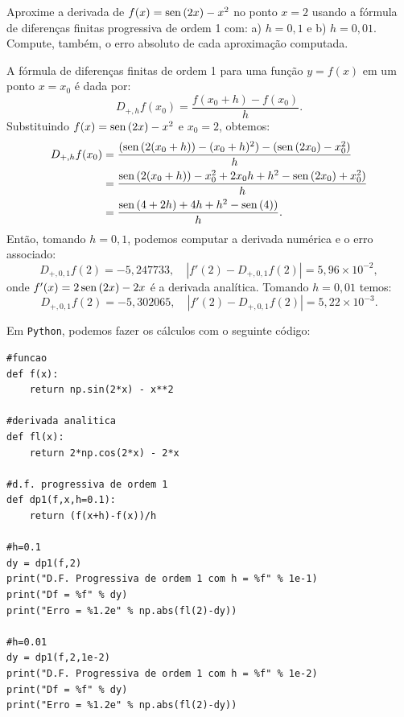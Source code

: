 \begin{exeresol}
Aproxime a derivada de $f(x)=\operatorname{sen}\,(2x) - x^2$ no ponto $x=2$ usando a fórmula de diferenças finitas progressiva de ordem 1 com: a) $h=0,1$ e b) $h=0,01$. Compute, também, o erro absoluto de cada aproximação computada.
\end{exeresol}
\begin{resol}
  A fórmula de diferenças finitas de ordem 1 para uma função $y = f(x)$ em um ponto $x = x_0$ é dada por:
  \begin{equation*}
    D_{+,h}f(x_0) = \frac{f(x_0+h) - f(x_0)}{h}.
  \end{equation*}
Substituindo $f(x) = \operatorname{sen}\,(2x) - x^2$ e $x_0 = 2$, obtemos:
  \begin{equation*}
    \begin{split}
      D_{+,h}f(x_0) &= \frac{(\operatorname{sen}\,(2(x_0+h)) - (x_0+h)^2) - (\operatorname{sen}\,(2x_0) - x_0^2)}{h}\\
      &= \frac{\operatorname{sen}\,(2(x_0+h)) - x_0^2 + 2x_0h + h^2 - \operatorname{sen}\,(2x_0) + x_0^2)}{h}\\
      &= \frac{\operatorname{sen}\,(4+2h) + 4h + h^2 - \operatorname{sen}\,(4))}{h}.
    \end{split}
  \end{equation*}
Então, tomando $h=0,1$, podemos computar a derivada numérica e o erro associado:
\begin{equation*}
  D_{+,0,1}f(2) = -5,247733,\quad |f'(2)-D_{+,0,1}f(2)| = 5,96\times 10^{-2},
\end{equation*}
onde $f'(x) = 2\operatorname{sen}\,(2x) - 2x$ é a derivada analítica. Tomando $h=0,01$ temos:
\begin{equation*}
  D_{+,0,1}f(2) = -5,302065,\quad |f'(2)-D_{+,0,1}f(2)| = 5,22\times 10^{-3}.
\end{equation*}

\ifispython
Em \verb+Python+, podemos fazer os cálculos com o seguinte código:
\begin{verbatim}
#funcao
def f(x):
    return np.sin(2*x) - x**2

#derivada analitica
def fl(x):
    return 2*np.cos(2*x) - 2*x

#d.f. progressiva de ordem 1
def dp1(f,x,h=0.1):
    return (f(x+h)-f(x))/h

#h=0.1
dy = dp1(f,2)
print("D.F. Progressiva de ordem 1 com h = %f" % 1e-1)
print("Df = %f" % dy)
print("Erro = %1.2e" % np.abs(fl(2)-dy))

#h=0.01
dy = dp1(f,2,1e-2)
print("D.F. Progressiva de ordem 1 com h = %f" % 1e-2)
print("Df = %f" % dy)
print("Erro = %1.2e" % np.abs(fl(2)-dy))
\end{verbatim}
\fi
\end{resol}


